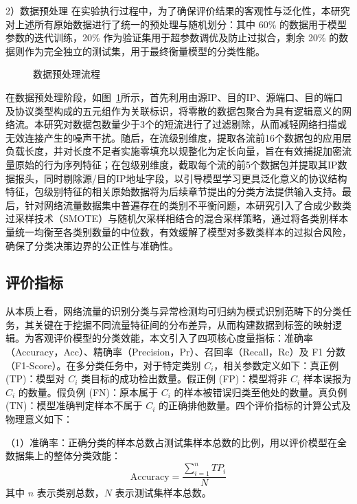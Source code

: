 2）数据预处理
在实验执行过程中，为了确保评价结果的客观性与泛化性，本研究对上述所有原始数据进行了统一的预处理与随机划分：其中 60\% 的数据用于模型参数的迭代训练，20\% 作为验证集用于超参数调优及防止过拟合，剩余 20\% 的数据则作为完全独立的测试集，用于最终衡量模型的分类性能。

\begin{figure}[ht]
  \centering
  \caption{数据预处理流程}
  \label{fig:datapreprocessing}
\end{figure}

在数据预处理阶段，如图~\ref{fig:datapreprocessing}所示，首先利用由源IP、目的IP、源端口、目的端口及协议类型构成的五元组作为关联标识，将零散的数据包聚合为具有逻辑意义的网络流。本研究对数据包数量少于3个的短流进行了过滤剔除，从而减轻网络扫描或无效连接产生的噪声干扰。随后，在流级别维度，提取各流前16个数据包的应用层负载长度，并对长度不足者实施零填充以规整化为定长向量，旨在有效捕捉加密流量原始的行为序列特征；在包级别维度，截取每个流的前5个数据包并提取其IP数据报头，同时剔除源/目的IP地址字段，以引导模型学习更具泛化意义的协议结构特征，包级别特征的相关原始数据将为后续章节提出的分类方法提供输入支持。最后，针对网络流量数据集中普遍存在的类别不平衡问题，本研究引入了合成少数类过采样技术（SMOTE）与随机欠采样相结合的混合采样策略，通过将各类别样本量统一均衡至各类别数量的中位数，有效缓解了模型对多数类样本的过拟合风险，确保了分类决策边界的公正性与准确性。

\subsection{评价指标}
从本质上看，网络流量的识别分类与异常检测均可归纳为模式识别范畴下的分类任务，其关键在于挖掘不同流量特征间的分布差异，从而构建数据到标签的映射逻辑。为客观评价模型的分类效能，本文引入了四项核心度量指标：准确率（Accuracy，Acc）、精确率（Precision，Pr）、召回率（Recall，Rc）及 F1 分数（F1-Score）。在多分类任务中，对于特定类别 $C_i$，相关参数定义如下：真正例 (TP)：模型对 $C_i$ 类目标的成功检出数量。假正例 (FP)：模型将非 $C_i$ 样本误报为 $C_i$ 的数量。假负例 (FN)：原本属于 $C_i$ 的样本被错误归类至他处的数量。真负例 (TN)：模型准确判定样本不属于 $C_i$ 的正确排他数量。四个评价指标的计算公式及物理意义如下：

（1）准确率：正确分类的样本总数占测试集样本总数的比例，用以评价模型在全数据集上的整体分类效能：
\begin{equation}
  \text{Accuracy} = \frac{\sum_{i=1}^n TP_i}{N}
  \label{eq:acc}
\end{equation}
其中 $n$ 表示类别总数，$N$ 表示测试集样本总数。

